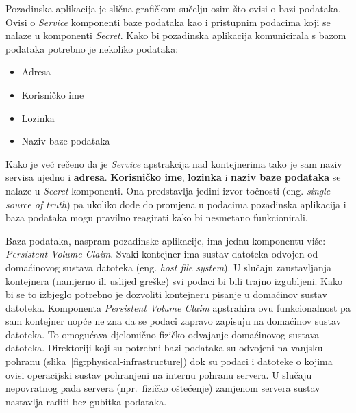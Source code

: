 Pozadinska aplikacija je slična grafičkom sučelju osim što ovisi o bazi podataka.
Ovisi o \textit{Service} komponenti baze podataka kao i pristupnim podacima koji se nalaze u komponenti \textit{Secret}.
Kako bi pozadinska aplikacija komunicirala s bazom podataka potrebno je nekoliko podataka:
\begin{itemize}
    \item Adresa
    \item Korisničko ime
    \item Lozinka
    \item Naziv baze podataka
\end{itemize}

Kako je već rečeno da je \textit{Service} apstrakcija nad kontejnerima tako je sam naziv servisa ujedno i \textbf{adresa}.
\textbf{Korisničko ime}, \textbf{lozinka} i \textbf{naziv baze podataka} se nalaze u \textit{Secret} komponenti.
Ona predstavlja jedini izvor točnosti (eng. \textit{single source of truth}) pa ukoliko dođe do promjena
u podacima pozadinska aplikacija i baza podataka mogu pravilno reagirati kako bi nesmetano funkcionirali.

Baza podataka, naspram pozadinske aplikacije, ima jednu komponentu više: \textit{Persistent Volume Claim}.
Svaki kontejner ima sustav datoteka odvojen od domaćinovog sustava datoteka (eng. \textit{host file system}).
U slučaju zaustavljanja kontejnera (namjerno ili uslijed greške) svi podaci bi bili trajno izgubljeni.
Kako bi se to izbjeglo potrebno je dozvoliti kontejneru pisanje u domaćinov sustav datoteka.
Komponenta \textit{Persistent Volume Claim} apstrahira ovu funkcionalnost pa sam kontejner uopće ne zna da se podaci zapravo
zapisuju na domaćinov sustav datoteka.
To omogućava djelomično fizičko odvajanje domaćinovog sustava datoteka.
Direktoriji koji su potrebni bazi podataka su odvojeni na vanjsku pohranu (slika~\ref{fig:physical-infrastructure}) dok su
podaci i datoteke o kojima ovisi operacijski sustav pohranjeni na internu pohranu servera.
U slučaju nepovratnog pada servera (npr.~fizičko oštećenje) zamjenom servera sustav nastavlja raditi bez gubitka podataka.
